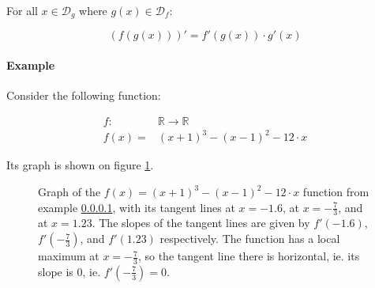 \documentclass[titlepage]{article}
\begin{document}
              For all $x \in \mathcal{D}_g$ where $g(x) \in \mathcal{D}_f$:

              $$(f(g(x)))' = f'(g(x)) \cdot g'(x)$$

          \paragraph{Example} \label{parsinglevarexample}

            Consider the following function:

            \begin{align*}
              f : & \mathbb{R} \rightarrow \mathbb{R} \\
              f(x) = & (x+1)^3 - (x-1)^2 - 12 \cdot x
            \end{align*}

            Its graph is shown on figure \ref{figsinglevarfunc}.

            \begin{figure}[!htb]
              \centering
              \caption{%
                Graph of the $f(x) = (x+1)^3 - (x-1)^2 - 12 \cdot x$ function
                from example \ref{parsinglevarexample}, with its tangent lines
                at $x=-1.6$, at $x=-\frac{7}{3}$, and at $x=1.23$. The slopes
                of the tangent lines are given by
                $f'(-1.6)$, $f'(-\frac{7}{3})$, and $f'(1.23)$ respectively.
                The function has a local maximum at $x=-\frac{7}{3}$, so the
                tangent line there is horizontal, ie. its slope is $0$, ie.
                $f'(-\frac{7}{3}) = 0$.
              } \label{figsinglevarfunc}
            \end{figure}
\end{document}
